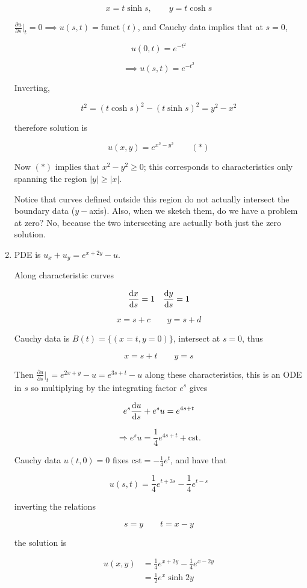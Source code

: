 \documentclass[a4paper]{article}
\begin{document}
\begin{enumerate}
	\[ x = t \sinh s, \qquad y = t \cosh s \]
	
	$ \frac{\partial u}{\partial s} \big|_{t} = 0 \implies u(s,t) = \text{funct}(t) $, and Cauchy data implies that at $ s = 0 $, 
	
	\[ u(0,t) = e^{-t^{2}} \]
	
	\[ \implies u(s,t) = e^{-t^{2}} \]
	
	Inverting,
	
	\[ t^{2} = (t \cosh s)^{2} - (t \sinh s)^{2} = y^{2} - x^{2} \]
	
	therefore solution is
	
	\[ u(x,y) = e^{x^{2} - y^{2}} \qquad (*) \]
	
	Now $ (*) $ implies that $ x^{2} - y^{2} \geq 0 $; this corresponds to characteristics only spanning the region $ | y | \geq | x | $.
	
	Notice that curves defined outside this region do not actually intersect the boundary data ($ y- $axis).
	Also, when we sketch them, do we have a problem at zero? No, because the two intersecting are actually both just the zero solution. 
	
	\item PDE is $ u_{x} + u_{y} = e^{x + 2y} - u $.
	
	Along characteristic curves
	
	\[ \frac{\mathrm{d} x}{\mathrm{d} s} = 1 \quad \frac{\mathrm{d} y}{\mathrm{d} s} = 1  \]
	
	
	\[ x = s + c \qquad y = s + d \]
	
	Cauchy data is $ B(t) = \{ (x = t, y = 0) \} $, intersect at $ s = 0 $, thus
	
	\[ x = s + t  \qquad y = s \]

	Then $ \frac{\partial u }{\partial s} \Big|_{t} = e^{2x + y} - u = e^{3s + t} - u $ along these characteristics, this is an ODE in $ s $ so multiplying by the integrating factor $ e^{s} $ gives
	
	\[ e^{s} \frac{\mathrm{d} u}{\mathrm{d} s} + e^{s} u = e^{4s + t}  \]
	
	\[ \Rightarrow e^{s} u = \frac{1}{4} e^{4s + t } + \text{cst.} \]
	
	Cauchy data  $ u(t,0) = 0 $ fixes $ \text{cst} = -  \frac{1}{4} e^{t} $, and have that
	
	\[ u(s,t) = \frac{1}{4} e^{t  + 3s} -  \frac{1}{4} e^{t-s}  \]


	inverting the relations
	
	\[ s = y \qquad t = x - y \]
	
	the solution is
	
	\begin{align*}
	u(x,y) & = \frac{1}{4}e^{x + 2y} - \frac{1}{4} e^{x - 2y}  \\
	& = \frac{1}{2}e^{x} \sinh 2y
	\end{align*}
	
\end{enumerate}
\end{document}
